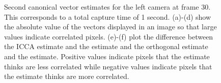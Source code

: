 \begin{figure}
\begin{center}
{    }
    \caption{Second canonical vector estimates for the left camera at frame 30. This corresponds
      to a total capture time of 1 second. (a)-(d) show the absolute value of the
      vectors displayed in an image so that large values indicate correlated
      pixels. (e)-(f) plot the difference between the ICCA estimate and the \iccap
      estimate and the orthogonal estimate and the \iccap estimate. Positive values
      indicate pixels that the \iccap estimate thinks are less correlated while negative
      values indicate pixels that the \iccap estimate thinks are more correlated. }
    \label{fig:chpt5:flashing3_2}
  \end{center}
\end{figure}

